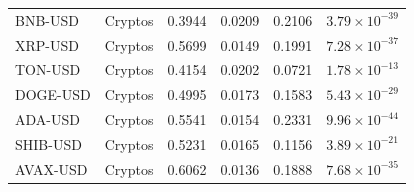 \documentclass{ledger}
\begin{document}
\begin{longtable}{|l|l|c|c|c|c|}
BNB-USD & Cryptos & 0.3944 & 0.0209 & 0.2106 & $3.79 \times 10^{-39}$ \\
XRP-USD & Cryptos & 0.5699 & 0.0149 & 0.1991 & $7.28 \times 10^{-37}$ \\
TON-USD & Cryptos & 0.4154 & 0.0202 & 0.0721 & $1.78 \times 10^{-13}$ \\
DOGE-USD & Cryptos & 0.4995 & 0.0173 & 0.1583 & $5.43 \times 10^{-29}$ \\
ADA-USD & Cryptos & 0.5541 & 0.0154 & 0.2331 & $9.96 \times 10^{-44}$ \\
SHIB-USD & Cryptos & 0.5231 & 0.0165 & 0.1156 & $3.89 \times 10^{-21}$ \\
AVAX-USD & Cryptos & 0.6062 & 0.0136 & 0.1888 & $7.68 \times 10^{-35}$ \\
\hline
\end{longtable}




\thispagestyle{pagelast}





\end{document}
